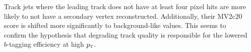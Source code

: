 %
Track jets where the leading track does not have at least four pixel hits are more likely to not have a secondary vertex reconstructed. Additionally, their MV2c20 score is shifted more significantly to background-like values. This seems to confirm the hypothesis that degrading track quality is responsible for the lowered $b$-tagging efficiency at high $p_{\textrm{\footnotesize\sc t}}$. 




